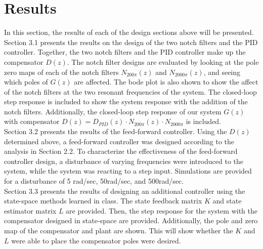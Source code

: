\documentclass[11pt]{article}
\begin{document}

\section{Results}
In this section, the results of each of the design sections above will be presented. Section 3.1 presents the results on the design of the two notch filters and the PID controller. Together, the two notch filters and the PID controller make up the compensator $D(z)$. The notch filter designs are evaluated by looking at the pole zero maps of each of the notch filters $N_{200\pi}(z)$ and $N_{2000\pi}(z)$, and seeing which poles of $G(z)$ are affected. The bode plot is also shown to show the affect of the notch filters at the two resonant frequencies of the system. The closed-loop step response is included to show the system response with the addition of the notch filters. Additionally, the closed-loop step response of our system $G(z)$ with compensator $D(z) = D_{PID}(z)\cdot N_{200\pi}(z) \cdot N_{2000\pi}$ is included.\\

Section 3.2 presents the results of the feed-forward controller. Using the $D(z)$ determined above, a feed-forward controller was designed according to the analysis in Section 2.2. To characterize the effectiveness of the feed-forward controller design, a disturbance of varying frequencies were introduced to the system, while the system was reacting to a step input. Simulations are provided for a disturbance of 5 rad/sec, 50rad/sec, and 500rad/sec. \\

Section 3.3 presents the results of designing an additional controller using the state-space methods learned in class. The state feedback matrix $K$ and state estimator matrix $L$ are provided. Then, the step response for the system with the compensator designed in state-space are provided. Additionally, the pole and zero map of the compensator and plant are shown. This will show whether the $K$ and $L$ were able to place the compensator poles were desired. \\
\end{document}
